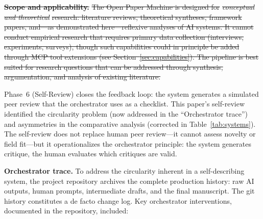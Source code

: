 \documentclass{article}
\providecommand{\DIFaddtex}[1]{{\protect\color{blue}\uwave{#1}}} %
\providecommand{\DIFdeltex}[1]{{\protect\color{red}\sout{#1}}}                      %
\providecommand{\DIFaddbegin}{} %
\providecommand{\DIFaddend}{} %
\providecommand{\DIFdelbegin}{} %
\providecommand{\DIFdelend}{} %
\providecommand{\DIFadd}[1]{\texorpdfstring{\DIFaddtex{#1}}{#1}} %
\providecommand{\DIFdel}[1]{\texorpdfstring{\DIFdeltex{#1}}{}} %
\newcommand{\DIFscaledelfig}{0.5}
\newlength{\DIFdelgraphicswidth} %
\newlength{\DIFdelgraphicsheight} %
\newcommand{\DIFaddincludegraphics}[2][]{{\color{blue}\fbox{\DIFOincludegraphics[#1]{#2}}}} %
\newcommand{\DIFdelincludegraphics}[2][]{%
\sbox{\DIFdelgraphicsbox}{\DIFOincludegraphics[#1]{#2}}%
\settoboxwidth{\DIFdelgraphicswidth}{\DIFdelgraphicsbox} %
\settoboxtotalheight{\DIFdelgraphicsheight}{\DIFdelgraphicsbox} %
\scalebox{\DIFscaledelfig}{%
\parbox[b]{\DIFdelgraphicswidth}{\usebox{\DIFdelgraphicsbox}\\[-\baselineskip] \rule{\DIFdelgraphicswidth}{0em}}\llap{\resizebox{\DIFdelgraphicswidth}{\DIFdelgraphicsheight}{%
\setlength{\unitlength}{\DIFdelgraphicswidth}%
\begin{picture}(1,1)%
\thicklines\linethickness{2pt} %
{\color[rgb]{1,0,0}\put(0,0){\framebox(1,1){}}}%
{\color[rgb]{1,0,0}\put(0,0){\line( 1,1){1}}}%
{\color[rgb]{1,0,0}\put(0,1){\line(1,-1){1}}}%
\end{picture}%
}\hspace*{3pt}}} %
} %
\DeclareRobustCommand{\DIFaddbegin}{\DIFOaddbegin \let\includegraphics\DIFaddincludegraphics} %
\DeclareRobustCommand{\DIFaddend}{\DIFOaddend \let\includegraphics\DIFOincludegraphics} %
\DeclareRobustCommand{\DIFdelbegin}{\DIFOdelbegin \let\includegraphics\DIFdelincludegraphics} %
\DeclareRobustCommand{\DIFdelend}{\DIFOaddend \let\includegraphics\DIFOincludegraphics} %
\begin{document}
\DIFdelbegin \textbf{\DIFdel{Scope and applicability.}} %
\DIFdel{The Open Paper Machine is designed for }\textit{\DIFdel{conceptual and theoretical}} %
\DIFdel{research: literature reviews, theoretical syntheses, framework papers, and---as demonstrated here---reflexive analyses of AI systems. It cannot conduct empirical research that requires primary data collection (interviews, experiments, surveys), though such capabilities could in principle be added through MCP tool extensions (see Section~\ref{sec:capabilities}). The pipeline is best suited for research questions that can be addressed through synthesis, argumentation, and analysis of existing literature.
}\DIFdelend %

Phase~6 (Self-Review) closes the feedback loop: the system generates a simulated peer review that the orchestrator uses as a checklist. This paper's self-review identified the circularity problem (now addressed in the ``Orchestrator trace'') and asymmetries in the comparative analysis (corrected in Table~\ref{tab:systems}). The self-review does not replace human peer review---it cannot assess novelty or field fit---but it operationalizes the orchestrator principle: the system generates critique, the human evaluates which critiques are valid.

\textbf{Orchestrator trace.} To address the circularity inherent in a self-describing system, the project repository archives the complete production history: raw AI outputs, human prompts, intermediate drafts, and the final manuscript. The git history constitutes a de facto change log. Key orchestrator interventions, documented in the repository, included\DIFaddbegin \DIFadd{, for instance}\DIFaddend :
\end{document}
